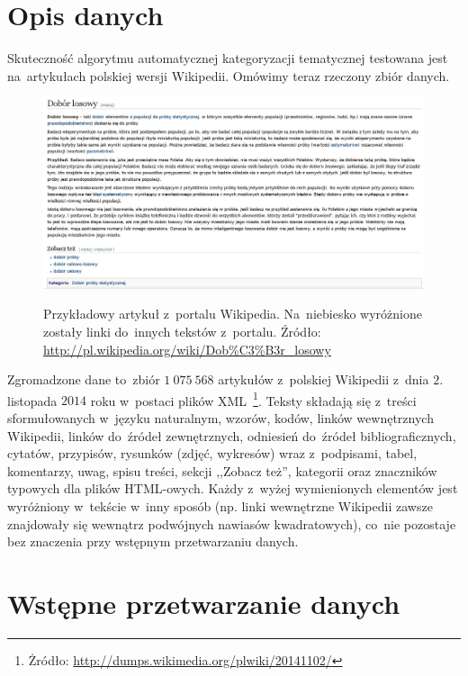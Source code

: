 \documentclass{praca1}
\begin{document}
\section{Opis danych}

Skuteczność algorytmu automatycznej kategoryzacji tematycznej testowana jest na~artykułach polskiej wersji Wikipedii. Omówimy teraz rzeczony zbiór danych.

\begin{figure}[!h]
  \centering
  \includegraphics[width=450pt]{wiki2.jpg}\\
  \caption{Przykładowy artykuł z~portalu Wikipedia. Na~niebiesko wyróżnione zostały linki do~innych tekstów z~portalu. Źródło: \url{http://pl.wikipedia.org/wiki/Dob\%C3\%B3r\_losowy}}\label{wiki}
\end{figure}

Zgromadzone dane to~zbiór $1\ 075\ 568$ artykułów z~polskiej Wikipedii z~dnia $2.$ listopada $2014$ roku w~postaci plików XML~\footnote{Żródło: \url{http://dumps.wikimedia.org/plwiki/20141102/}}. Teksty składają się z~treści sformułowanych w~języku naturalnym, wzorów, kodów, linków wewnętrznych Wikipedii, linków do~źródeł zewnętrznych, odniesień do~źródeł bibliograficznych, cytatów, przypisów, rysunków (zdjęć, wykresów) wraz z~podpisami, tabel, komentarzy, uwag, spisu treści, sekcji ,,Zobacz też'', kategorii oraz znaczników typowych dla plików HTML-owych. Każdy z~wyżej wymienionych elementów jest wyróżniony w~tekście w~inny sposób (np. linki wewnętrzne Wikipedii zawsze znajdowały się wewnątrz podwójnych nawiasów kwadratowych), co~nie pozostaje bez znaczenia przy wstępnym przetwarzaniu danych.

\section{Wstępne przetwarzanie danych}
\end{document}
